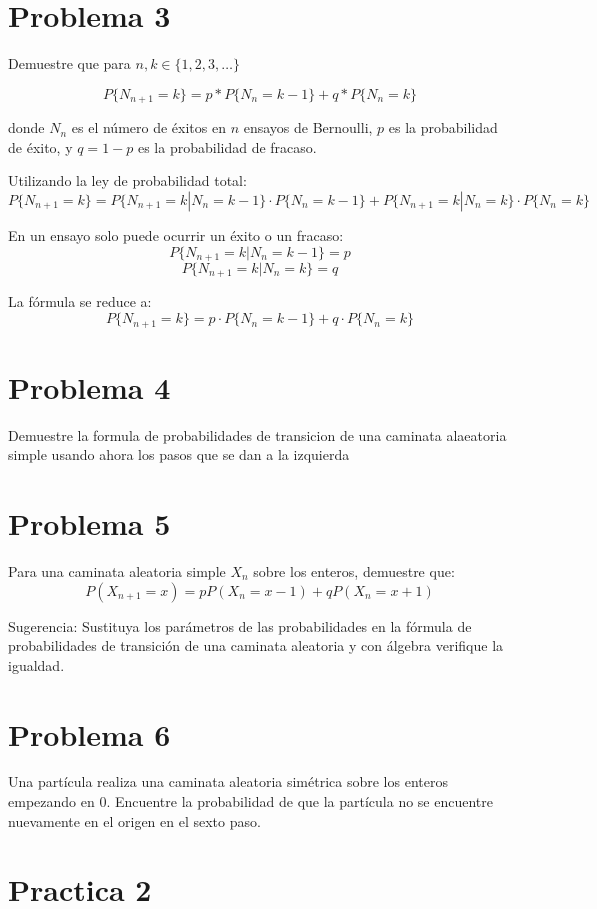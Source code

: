 \documentclass{article}
\begin{document}
\section{Problema 3}

Demuestre que para $n,k \in \{1,2,3,\dots\}$

\[P\{N_{n+1} = k\} = p * P\{N_n = k-1\} + q * P\{N_n = k\}\]

donde $N_n$ es el número de éxitos en $n$ ensayos de Bernoulli, $p$ es la probabilidad de éxito, y $q = 1 - p$ es la probabilidad de fracaso.

Utilizando la ley de probabilidad total:
\[ P\{N_{n+1} = k\} = P\{N_{n+1} = k | N_n = k-1\} \cdot P\{N_n = k-1\} + P\{N_{n+1} = k | N_n = k\} \cdot P\{N_n = k\} \]

En un ensayo solo puede ocurrir un éxito o un fracaso:
\[ P\{N_{n+1} = k | N_n = k-1\} = p \]
\[ P\{N_{n+1} = k | N_n = k\} = q \]

La fórmula se reduce a:
\[ P\{N_{n+1} = k\} = p \cdot P\{N_n = k-1\} + q \cdot P\{N_n = k\} \]

\section{Problema 4}

Demuestre la formula de probabilidades de transicion de una caminata alaeatoria simple usando ahora los pasos que se dan a la izquierda

\section{Problema 5}

Para una caminata aleatoria simple \(X_n\) sobre los enteros, demuestre que:
\[ P(X_{n+1} = x) = pP(X_n = x - 1) + qP(X_n = x + 1) \]

Sugerencia: Sustituya los parámetros de las probabilidades en la fórmula de probabilidades de transición de una caminata aleatoria y con álgebra verifique la igualdad.

\section{Problema 6}

Una partícula realiza una caminata aleatoria simétrica sobre los enteros empezando en 0. Encuentre la probabilidad de que la partícula no se encuentre nuevamente en el origen en el sexto paso.

\section{Practica 2}
\end{document}
